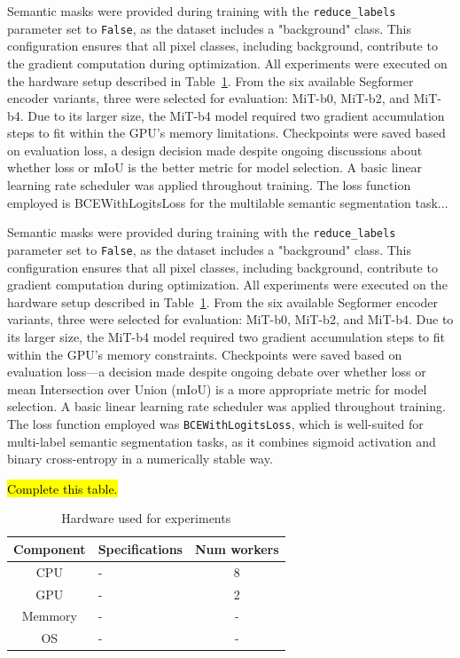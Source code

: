 Semantic masks were provided during training with the \texttt{reduce\_labels} parameter set to \texttt{False}, as the dataset includes a "background" class. This configuration ensures that all pixel classes, including background, contribute to the gradient computation during optimization. All experiments were executed on the hardware setup described in Table~\ref{tab:hardware}. From the six available Segformer encoder variants, three were selected for evaluation: MiT-b0, MiT-b2, and MiT-b4. Due to its larger size, the MiT-b4 model required two gradient accumulation steps to fit within the GPU's memory limitations. Checkpoints were saved based on evaluation loss, a design decision made despite ongoing discussions about whether loss or mIoU is the better metric for model selection. A basic linear learning rate scheduler was applied throughout training. The loss function employed is BCEWithLogitsLoss for the multilable semantic segmentation task...

Semantic masks were provided during training with the \texttt{reduce\_labels} parameter set to \texttt{False}, as the dataset includes a "background" class. This configuration ensures that all pixel classes, including background, contribute to gradient computation during optimization. All experiments were executed on the hardware setup described in Table~\ref{tab:hardware}. From the six available Segformer encoder variants, three were selected for evaluation: MiT-b0, MiT-b2, and MiT-b4. Due to its larger size, the MiT-b4 model required two gradient accumulation steps to fit within the GPU's memory constraints. Checkpoints were saved based on evaluation loss—a decision made despite ongoing debate over whether loss or mean Intersection over Union (mIoU) is a more appropriate metric for model selection. A basic linear learning rate scheduler was applied throughout training. The loss function employed was \texttt{BCEWithLogitsLoss}, which is well-suited for multi-label semantic segmentation tasks, as it combines sigmoid activation and binary cross-entropy in a numerically stable way.


\hl{Complete this table.}
\begin{table}[h]
    \centering
    \begin{tabular}{c l c}
        \toprule
        \textbf{Component} & \textbf{Specifications} & \textbf{Num workers} \\
        \midrule
        CPU         & - & 8 \\
        GPU         & - & 2 \\      
        Memmory     & - & - \\
        OS          & - & - \\
        \bottomrule
    \end{tabular}
    \caption{ Hardware used for experiments }
    \label{tab:hardware}
\end{table}

